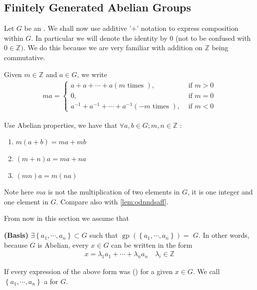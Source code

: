 \documentclass{article}
\newcommand{\bfs}[1]{\textbf{({#1}) }}
\newcommand{\gp}{\operatorname{gp}}
\begin{document}
\subsection{Finitely Generated Abelian Groups}\label{sec:cxvdf}
Let $G$ be an . We shall now use additive '$+$' notation to express composition within $G$. In particular we will denote the identity by $0$ (not to be confused with $0 \in \mathbb{Z})$. We do this because we are very familiar with addition on $\mathbb{Z}$ being commutative. 

Given $m \in \mathbb{Z}$ and $a \in G$, we write
\begin{align*}
m a= \begin{cases}a + a + \cdots + a(m \text { times }), & \text { if } m>0 \\ 0, & \text { if } m=0 \\ a^{-1} + a^{-1} + \cdots + a^{-1}(-m \text { times }), & \text { if } m<0\end{cases}
\end{align*}
\begin{lema}\label{lem:abe_pro}
 Use Abelian properties, we have that $\forall a, b \in G ; m, n \in \mathbb{Z}$ :
\begin{enumerate}
    \item $m(a+b)=m a+m b$
    \item $(m+n) a=m a+n a$
    \item $(m n) a=m(n a)$
\end{enumerate}
\end{lema}
\begin{rema}
Note here $ma$ is not the multiplication of two elements in $G$, it is one integer and one element in $G$. Compare also with \cref{lem:odnndsaff}.
\end{rema}

From now in this section we assume that

\centerline{}

\begin{defa}{\bfs{Basis}}
$\exists\left\{a_{1}, \cdots, a_{n}\right\} \subset G$ such that $
\gp\left(\left\{a_{1}, \cdots, a_{n}\right\}\right)=$
$G$. In other words, because $G$ is Abelian, every $x \in G$ can be written in the form
\begin{align}
x=\lambda_{1} a_{1}+\cdots+\lambda_{n} a_{n} \quad \lambda_{i} \in \mathbb{Z} \label{eq:dec_bas}
\end{align}

If every expression of the above form was  () for a given $x \in G$.  We call $\left\{a_{1}, \cdots, a_{n}\right\}$ a  for $G$.
\end{defa}
\end{document}
